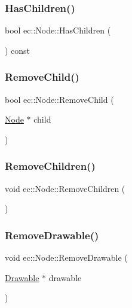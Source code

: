 \mbox{\label{classec_1_1_node_add6f4b234aebaeb7d1e76d42234b9831}} 
\subsubsection{\texorpdfstring{Has\+Children()}{HasChildren()}}
{\footnotesize\ttfamily bool ec\+::\+Node\+::\+Has\+Children (\begin{DoxyParamCaption}{ }\end{DoxyParamCaption}) const}

\mbox{\label{classec_1_1_node_a65f938c730afc4f5b4fcceb64ac84416}} 
\subsubsection{\texorpdfstring{Remove\+Child()}{RemoveChild()}}
{\footnotesize\ttfamily bool ec\+::\+Node\+::\+Remove\+Child (\begin{DoxyParamCaption}\item[{\mbox{\hyperlink{classec_1_1_node}{Node}} $\ast$}]{child }\end{DoxyParamCaption})}

\mbox{\label{classec_1_1_node_ae91a96819729bc06c17870fa8cca2129}} 
\subsubsection{\texorpdfstring{Remove\+Children()}{RemoveChildren()}}
{\footnotesize\ttfamily void ec\+::\+Node\+::\+Remove\+Children (\begin{DoxyParamCaption}{ }\end{DoxyParamCaption})}

\mbox{\label{classec_1_1_node_acd641d3927ae368628ac90d5d79597d9}} 
\subsubsection{\texorpdfstring{Remove\+Drawable()}{RemoveDrawable()}}
{\footnotesize\ttfamily void ec\+::\+Node\+::\+Remove\+Drawable (\begin{DoxyParamCaption}\item[{\mbox{\hyperlink{classec_1_1_drawable}{Drawable}} $\ast$}]{drawable }\end{DoxyParamCaption})}

